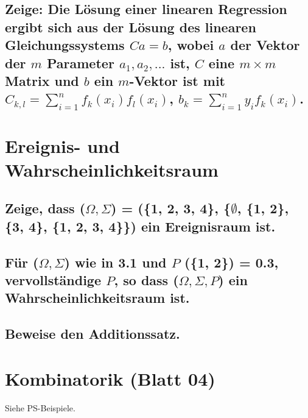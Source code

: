\documentclass[a4paper,10pt]{article}
\begin{document}
\subsection{Zeige: Die Lösung einer linearen Regression ergibt sich aus der Lösung des linearen Gleichungssystems $C a = b$, wobei $a$ der Vektor der $m$ Parameter $a_1 , a_2 , . . .$ ist, $C$ eine $m × m$ Matrix und $b$ ein $m$-Vektor ist mit\newline
$C_{k,l}=\sum\limits_{i=1}^n f_k (x_i)f_l (x_i)$, $b_k = \sum\limits_{i=1}^n y_i f_k (x_i)$.}

\newpage
\section{Ereignis- und Wahrscheinlichkeitsraum}
\subsection{Zeige, dass ($\Omega, \Sigma$) = (\{1, 2, 3, 4\}, \{$\emptyset$, \{1, 2\}, \{3, 4\}, \{1, 2, 3, 4\}\}) ein Ereignisraum ist.}

\subsection{Für ($\Omega, \Sigma$) wie in 3.1 und $P$ (\{1, 2\}) = 0.3, vervollständige $P$, so dass ($\Omega, \Sigma, P$) ein Wahrscheinlichkeitsraum ist.}

\subsection{Beweise den Additionssatz.}

\newpage
\section{Kombinatorik (Blatt 04)} %
Siehe PS-Beispiele.
\subsection{}

\subsection{}
\end{document}
